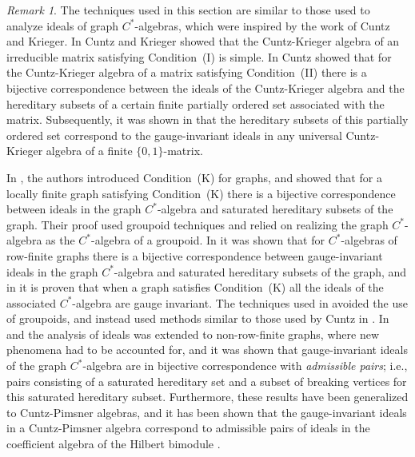 \documentclass[11pt]{amsart}
\theoremstyle{remark}
\newtheorem{remark}[theorem]{Remark}
\numberwithin{equation}{section}
\begin{document}
\begin{remark} \label{ideal-history}
The techniques used in this section are similar to those used to analyze ideals of graph $C^*$-algebras, which were inspired by the work of Cuntz and Krieger.  In \cite{CK} Cuntz and Krieger showed that the Cuntz-Krieger algebra of an irreducible matrix satisfying Condition~(I) is simple.  In \cite[Theorem~2.5]{C2} Cuntz showed that for the Cuntz-Krieger algebra of a matrix satisfying Condition~(II) there is a bijective correspondence between the ideals of the Cuntz-Krieger algebra and the hereditary subsets of a certain finite partially ordered set associated with the matrix.  Subsequently, it was shown in \cite[Theorem~3.5]{aHR} that the hereditary subsets of this partially ordered set correspond to the gauge-invariant ideals in any universal Cuntz-Krieger algebra of a finite $\{0,1\}$-matrix.  

In \cite[Theorem~6.6]{KPRR}, the authors introduced Condition~(K) for graphs, and showed that for a locally finite graph satisfying Condition~(K) there is a bijective correspondence between ideals in the graph $C^*$-algebra and saturated hereditary subsets of the graph.  Their proof used groupoid techniques and relied on realizing the graph $C^*$-algebra as the $C^*$-algebra of a groupoid.  In \cite[Theorem~4.1]{BPRS} it was shown that for $C^*$-algebras of row-finite graphs there is a bijective correspondence between gauge-invariant ideals in the graph $C^*$-algebra and saturated hereditary subsets of the graph, and in \cite[Theorem~4.4]{BPRS} it is proven that when a graph satisfies Condition~(K) all the ideals of the associated $C^*$-algebra are gauge invariant.  The techniques used in \cite{BPRS} avoided the use of groupoids, and instead used methods similar to those used by Cuntz in \cite{C2}.  In \cite[Theorem~3.6]{BHRS} and \cite[Theorem~3.5]{DT1} the analysis of ideals was extended to non-row-finite graphs, where new phenomena had to be accounted for, and it was shown that gauge-invariant ideals of the graph $C^*$-algebra are in bijective correspondence with \emph{admissible pairs}; i.e., pairs consisting of a saturated hereditary set and a subset of breaking vertices for this saturated hereditary subset.  Furthermore, these results have been generalized to Cuntz-Pimsner algebras, and it has been shown that the gauge-invariant ideals in a Cuntz-Pimsner algebra correspond to admissible pairs of ideals in the coefficient algebra of the Hilbert bimodule \cite[Theorem~8.6]{Kat5}.




\end{remark}
\end{document}
